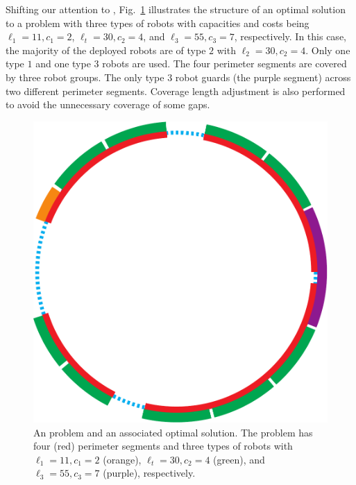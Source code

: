 Shifting our attention to \opgmc, Fig.~\ref{fig:opgmc} illustrates the 
structure of an optimal solution to a problem with three types of robots 
with capacities and costs being $\ell_1=11, c_1=2$, $\ell_t=30, 
c_2=4$, and $\ell_3=55, c_3=7$, respectively. In this case, the majority 
of the deployed robots are of type $2$ with $\ell_2=30, c_2=4$. Only one 
type $1$ and one type $3$ robots are used. The four perimeter segments are 
covered by three robot groups. 
%
%
The only type $3$ robot guards (the purple segment) across two different 
perimeter segments. Coverage length adjustment is also performed to avoid 
the unnecessary coverage of some gaps. 

\begin{figure}[!ht]
    \centering
    \includegraphics[scale = 0.4]{chapters/opg-ext/figures/opgmc-new-t-eps-converted-to.pdf}
    \caption{An \opgmc problem and an associated optimal solution. The 
		problem has four (red) perimeter segments and three types of robots
		with $\ell_1=11, c_1=2$ (orange), $\ell_t=30, c_2=4$ (green), 
		and $\ell_3=55, c_3=7$ (purple), respectively.}
		\label{fig:opgmc}
\end{figure}

